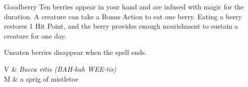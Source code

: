 \begin{Spell}[
    level=1st,
    time=1 Action,
    range=Self,
    components={V, S, M},
    duration=24 Hours,
    school=Conjuration,
    attack=None,
    effect=Healing
]{Goodberry}
Ten berries appear in your hand and are infused with magic for the duration. A creature can take a Bonus Action to eat one berry. Eating a berry restores 1 Hit Point, and the berry provides enough nourishment to sustain a creature for one day.

Uneaten berries disappear when the spell ends.

\begin{components}
V & \textit{Bacca vitis (BAH-kah WEE-tis)} \\
M & a sprig of mistletoe
\end{components}
\end{Spell}

